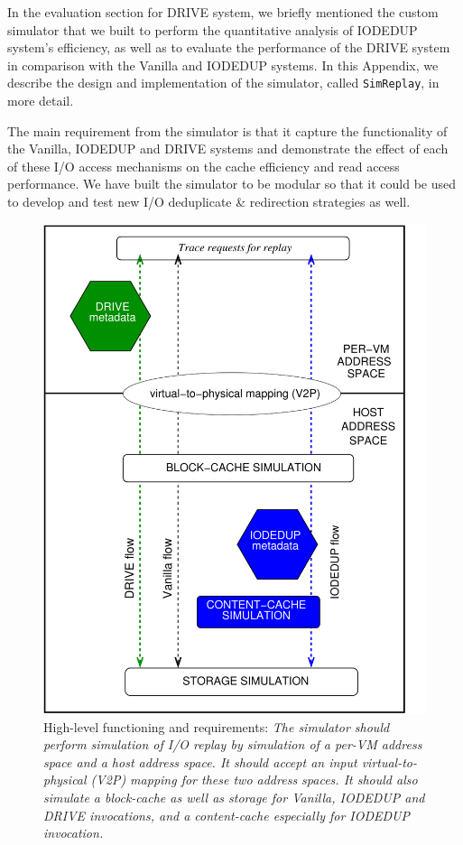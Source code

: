 In the evaluation section for DRIVE system, we briefly mentioned the custom 
simulator that
we built to perform the quantitative analysis of IODEDUP system's efficiency,
as well as to evaluate the performance of the DRIVE system in comparison
with the Vanilla and IODEDUP systems. In this Appendix, we describe the
design and implementation of the simulator, called \texttt{SimReplay},
in more detail.

The main requirement from the simulator is that it capture the functionality of
the Vanilla, IODEDUP and DRIVE systems and demonstrate the effect of
each of these I/O access mechanisms on the cache efficiency and read
access performance. 
We have built the simulator to be modular so that it could be used to
develop and test new I/O deduplicate \& redirection strategies as well.

\begin{figure}[h]
    \centering
    \includegraphics[scale=0.55]{simreplaychap-figures/simreplay-drive-extension.pdf}
    \caption{High-level functioning and requirements: \textit{The simulator should perform 
			simulation of I/O replay by simulation of a per-VM address space 
			and a host address space. It should accept an input 
			virtual-to-physical (V2P) mapping for these two address spaces. 
			It should also simulate a block-cache as well as storage for
			Vanilla, IODEDUP and DRIVE invocations, 
			and a content-cache especially for IODEDUP invocation.}}
    \label{fig:simreplay-requirements}
\end{figure}


